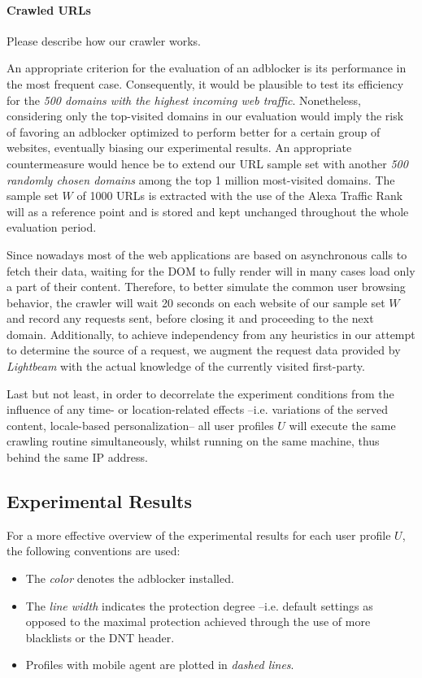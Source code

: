 \documentclass{sig-alternate}
\begin{document}
\paragraph{Crawled URLs}
{\color{red}Please describe how our crawler works.}
{\color{blue}
An appropriate criterion for the evaluation of an adblocker is its performance in the most frequent case. Consequently, it would be plausible to test its efficiency for the \textit{500 domains with the highest incoming web traffic}. Nonetheless, considering only the top-visited domains in our evaluation would imply the risk of favoring an adblocker optimized to perform better for a certain group of websites, eventually biasing our experimental results. An appropriate countermeasure would hence be to extend our URL sample set with another \textit{500 randomly chosen domains} among the top 1 million most-visited domains. The sample set $W$ of 1000 URLs is extracted with the use of the Alexa Traffic Rank will as a reference point and is stored and kept unchanged throughout the whole evaluation period.

Since nowadays most of the web applications are based on asynchronous calls to fetch their data, waiting for the DOM to fully render will in many cases load only a part of their content. Therefore, to better simulate the common user browsing behavior, the crawler will wait 20 seconds on each website of our sample set $W$ and record any requests sent, before closing it and proceeding to the next domain. Additionally, to achieve independency from any heuristics in our attempt to determine the source of a request, we augment the request data provided by \textit{Lightbeam} with the actual knowledge of the currently visited first-party.

Last but not least, in order to decorrelate the experiment conditions from the influence of any time- or location-related effects --i.e. variations of the served content, locale-based personalization-- all user profiles $U$ will execute the same crawling routine simultaneously, whilst running on the same machine, thus behind the same IP address.
}

\subsection{Experimental Results}
{\color{blue} For a more effective overview of the experimental results for each user profile $U$, the following conventions are used:
\begin{itemize}
 \item The \textit{color} denotes the adblocker installed.
 \item The \textit{line width} indicates the protection degree --i.e. default settings as opposed to the maximal protection achieved through the use of more blacklists or the DNT header.
 \item Profiles with mobile agent are plotted in \textit{dashed lines}.
\end{itemize}


}
\end{document}
